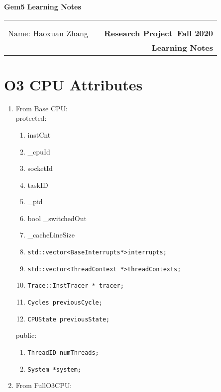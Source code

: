 \documentclass[11pt]{article}
\makeatletter
\newcommand{\course}{Research Project}
\newcommand{\semester}{Fall 2020}
\newcommand{\hwk}{Learning Notes}
\newcommand{\reportname}{Gem5 Learning Notes}
\renewcommand\maketitle{
\begin{center}
  {\huge\bf\reportname}\\
\begin{tabular*}{6.44in}{l @{\extracolsep{\fill}}c r}
\bfseries   &   &  \bfseries \\
\bfseries   &   &  \bfseries \\
Name: Haoxuan Zhang \bfseries  &  & \bfseries \course ~\semester\\
 \bfseries&  & \bfseries  \hwk
\end{tabular*}
\end{center} }
\makeatother
\begin{document}
\maketitle
{}


\section{O3 CPU Attributes}
	\begin{enumerate}
		\item From Base CPU:\\
		
		protected:
			\begin{enumerate}[label={\arabic*.}]
				\item instCnt
				\item \_cpuId
        \item socketId
        \item taskID
        \item \_pid
        \item bool \_switchedOut
        \item \_cacheLineSize
        \item \texttt{std::vector\textless BaseInterrupts*\textgreater interrupts;}
        \item \texttt{std::vector\textless ThreadContext *\textgreater threadContexts;}
        \item \texttt{Trace::InstTracer * tracer;}
        \item \texttt{Cycles previousCycle;}
    		\item \texttt{CPUState previousState;}
			\end{enumerate}
		public:
			\begin{enumerate}[label={\arabic*.}]
				\item \texttt{ThreadID numThreads;}
				\item \texttt{System *system;}
			\end{enumerate}
			
		\item From FullO3CPU:\\
		

\end{enumerate}
\end{document}
